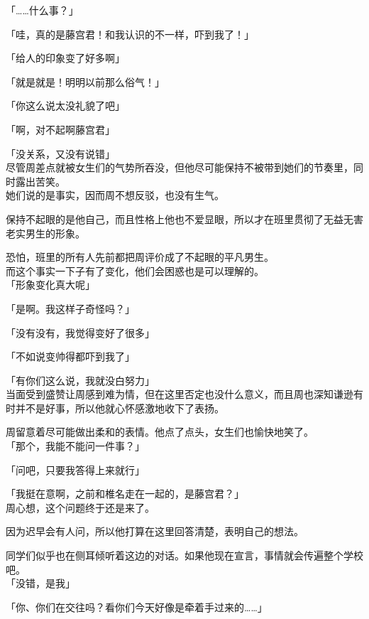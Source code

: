 「……什么事？」

「哇，真的是藤宫君！和我认识的不一样，吓到我了！」

「给人的印象变了好多啊」

「就是就是！明明以前那么俗气！」

「你这么说太没礼貌了吧」

「啊，对不起啊藤宫君」

「没关系，又没有说错」\\

尽管周差点就被女生们的气势所吞没，但他尽可能保持不被带到她们的节奏里，同时露出苦笑。\\

她们说的是事实，因而周不想反驳，也没有生气。

保持不起眼的是他自己，而且性格上他也不爱显眼，所以才在班里贯彻了无益无害老实男生的形象。

恐怕，班里的所有人先前都把周评价成了不起眼的平凡男生。\\

而这个事实一下子有了变化，他们会困惑也是可以理解的。\\

「形象变化真大呢」

「是啊。我这样子奇怪吗？」

「没有没有，我觉得变好了很多」

「不如说变帅得都吓到我了」

「有你们这么说，我就没白努力」\\

当面受到盛赞让周感到难为情，但在这里否定也没什么意义，而且周也深知谦逊有时并不是好事，所以他就心怀感激地收下了表扬。

周留意着尽可能做出柔和的表情。他点了点头，女生们也愉快地笑了。\\

「那个，我能不能问一件事？」

「问吧，只要我答得上来就行」

「我挺在意啊，之前和椎名走在一起的，是藤宫君？」\\

周心想，这个问题终于还是来了。

因为迟早会有人问，所以他打算在这里回答清楚，表明自己的想法。

同学们似乎也在侧耳倾听着这边的对话。如果他现在宣言，事情就会传遍整个学校吧。\\

「没错，是我」

「你、你们在交往吗？看你们今天好像是牵着手过来的……」

